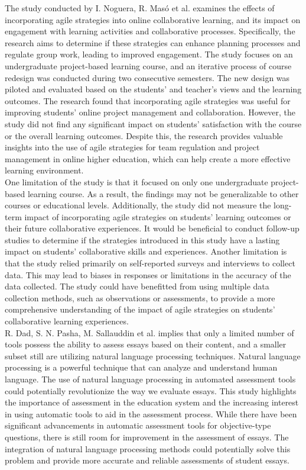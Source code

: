 The study conducted by I. Noguera, R. Masó et al. examines the effects of incorporating agile strategies into online collaborative learning, and its impact on engagement with learning activities and collaborative processes. Specifically, the research aims to determine if these strategies can enhance planning processes and regulate group work, leading to improved engagement. The study focuses on an undergraduate project-based learning course, and an iterative process of course redesign was conducted during two consecutive semesters. The new design was piloted and evaluated based on the students' and teacher's views and the learning outcomes. The research found that incorporating agile strategies was useful for improving students' online project management and collaboration. However, the study did not find any significant impact on students' satisfaction with the course or the overall learning outcomes. Despite this, the research provides valuable insights into the use of agile strategies for team regulation and project management in online higher education, which can help create a more effective learning environment.\\

One limitation of the study is that it focused on only one undergraduate project-based learning course. As a result, the findings may not be generalizable to other courses or educational levels. Additionally, the study did not measure the long-term impact of incorporating agile strategies on students' learning outcomes or their future collaborative experiences. It would be beneficial to conduct follow-up studies to determine if the strategies introduced in this study have a lasting impact on students' collaborative skills and experiences. Another limitation is that the study relied primarily on self-reported surveys and interviews to collect data. This may lead to biases in responses or limitations in the accuracy of the data collected. The study could have benefitted from using multiple data collection methods, such as observations or assessments, to provide a more comprehensive understanding of the impact of agile strategies on students' collaborative learning experiences. \cite{noguera2018collaborative}\\

R. Dad, S. N. Pasha, M. Sallauddin et al. implies that only a limited number of tools possess the ability to assess essays based on their content, and a smaller subset still are utilizing natural language processing techniques. Natural language processing is a powerful technique that can analyze and understand human language. The use of natural language processing in automated assessment tools could potentially revolutionize the way we evaluate essays. This study highlights the importance of assessment in the education system and the increasing interest in using automatic tools to aid in the assessment process. While there have been significant advancements in automatic assessment tools for objective-type questions, there is still room for improvement in the assessment of essays. The integration of natural language processing methods could potentially solve this problem and provide more accurate and reliable assessments of student essays.\\

